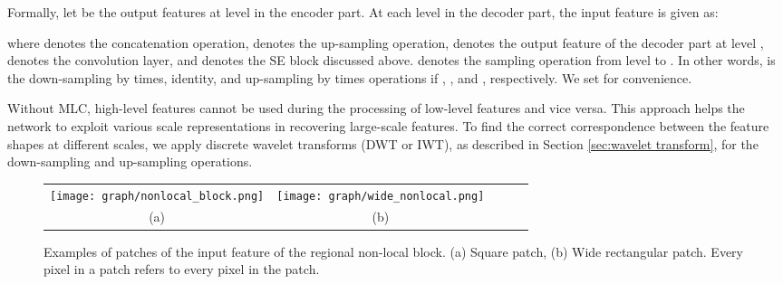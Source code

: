 \documentclass[a4paper,fleqn]{cas-dc}
\begin{document}
 
Formally, let  be the output features at level   in the encoder part. At each level    in the decoder part, the input feature  is given as: 

where  denotes the concatenation operation,  denotes the up-sampling operation,  denotes the output feature of the decoder part at level ,  denotes the  convolution layer, and  denotes the SE block discussed above.  denotes the sampling operation from level  to . In other words,  is the down-sampling by  times, identity, and up-sampling by  times operations if  , , and , respectively. We set   for convenience.

 Without MLC, high-level features cannot be used during the processing of low-level features and vice versa. This approach helps the network to exploit various scale representations in recovering large-scale features. To find the correct correspondence between the feature shapes at different scales, we apply discrete wavelet transforms (DWT or IWT), as described in Section \ref{sec:wavelet transform}, for the down-sampling and up-sampling operations.




\begin{figure*}[!t]\footnotesize
	\centering
	\setlength{\tabcolsep}{0pt}
	
	\begin{tabular}{cclcclccl}
		\multicolumn{3}{c}{\texttt{[image: graph/nonlocal\_block.png]}}\hspace{10mm}\ &
		\multicolumn{3}{c}{\texttt{[image: graph/wide\_nonlocal.png]}}\\
		\multicolumn{3}{c}{(a)} &
		\multicolumn{3}{c}{(b)} 
	\end{tabular}
	\caption{Examples of patches of the input feature of the regional non-local block. (a) Square patch, (b) Wide rectangular patch. Every pixel in a patch refers to every pixel in the patch. } 
	\label{fig:nonlocal_block}
\end{figure*}
\end{document}
